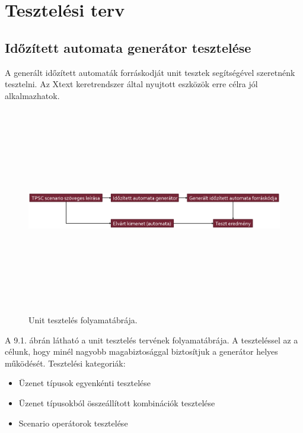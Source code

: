 \chapter{Tesztelési terv}

\section{Időzített automata generátor tesztelése}

A generált időzített automaták forráskodját unit tesztek segítségével szeretnénk tesztelni.
Az Xtext keretrendszer által nyujtott eszközök erre célra jól alkalmazhatok.

\begin{figure}[!ht]
    \centering
    \includegraphics[width=150mm, height=9cm, keepaspectratio]{figures/unit_test_flow.png}
    \caption{Unit tesztelés folyamatábrája.}
\end{figure}

A 9.1. ábrán látható a unit tesztelés tervének folyamatábrája.
A teszteléssel az a célunk, hogy minél nagyobb magabiztosággal biztosítjuk a generátor helyes működését.
Tesztelési kategoriák:

\begin{itemize}
    \item Üzenet típusok egyenkénti tesztelése
    \item Üzenet típusokból összeállított kombinációk tesztelése
    \item Scenario operátorok tesztelése
\end{itemize}

